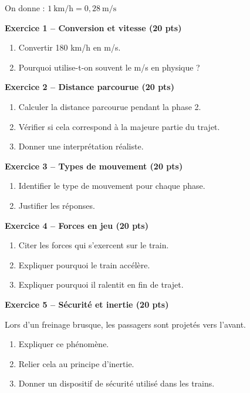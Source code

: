 \documentclass[11pt,a4paper]{article}
\begin{document}
On donne : $1\ \text{km/h} = 0{,}28\ \text{m/s}$

\bigskip

\textbf{Exercice 1 – Conversion et vitesse (20 pts)}

\begin{enumerate}
\item Convertir 180 km/h en m/s.
\item Pourquoi utilise-t-on souvent le m/s en physique ?
\end{enumerate}

\bigskip

\textbf{Exercice 2 – Distance parcourue (20 pts)}

\begin{enumerate}
\item Calculer la distance parcourue pendant la phase 2.
\item Vérifier si cela correspond à la majeure partie du trajet.
\item Donner une interprétation réaliste.
\end{enumerate}

\bigskip

\textbf{Exercice 3 – Types de mouvement (20 pts)}

\begin{enumerate}
\item Identifier le type de mouvement pour chaque phase.
\item Justifier les réponses.
\end{enumerate}

\bigskip

\textbf{Exercice 4 – Forces en jeu (20 pts)}

\begin{enumerate}
\item Citer les forces qui s’exercent sur le train.
\item Expliquer pourquoi le train accélère.
\item Expliquer pourquoi il ralentit en fin de trajet.
\end{enumerate}

\bigskip

\textbf{Exercice 5 – Sécurité et inertie (20 pts)}

Lors d’un freinage brusque, les passagers sont projetés vers l’avant.

\begin{enumerate}
\item Expliquer ce phénomène.
\item Relier cela au principe d’inertie.
\item Donner un dispositif de sécurité utilisé dans les trains.
\end{enumerate}
\end{document}
